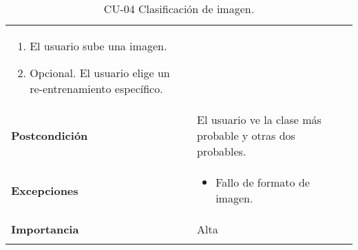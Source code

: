 \begin{longtable}[H]{@{}ll@{}}
\begin{minipage}[t]{0.68\columnwidth}
\begin{enumerate}
\def\labelenumi{\arabic{enumi}.}
\tightlist
\item
  El usuario sube una imagen.
\item 
  Opcional. El usuario elige un re-entrenamiento específico.
\end{enumerate}\strut
\end{minipage}\tabularnewline
\begin{minipage}[t]{0.26\columnwidth}\raggedright\strut
\textbf{Postcondición}\strut
\end{minipage} & \begin{minipage}[t]{0.68\columnwidth}\raggedright\strut%
El usuario ve la clase más probable y otras dos probables.\strut
\end{minipage}\tabularnewline
\begin{minipage}[t]{0.26\columnwidth}\raggedright\strut
\textbf{Excepciones}\strut
\end{minipage} & \begin{minipage}[t]{0.68\columnwidth}\raggedright\strut%
\begin{itemize}
\tightlist
\item
  Fallo de formato de imagen.
\end{itemize}\strut
\end{minipage}\tabularnewline
\begin{minipage}[t]{0.26\columnwidth}\raggedright\strut
\textbf{Importancia}\strut
\end{minipage} & \begin{minipage}[t]{0.68\columnwidth}\raggedright\strut%
Alta\strut
\end{minipage}\tabularnewline
\bottomrule%
\caption{CU-04 Clasificación de imagen.}
\end{longtable}


